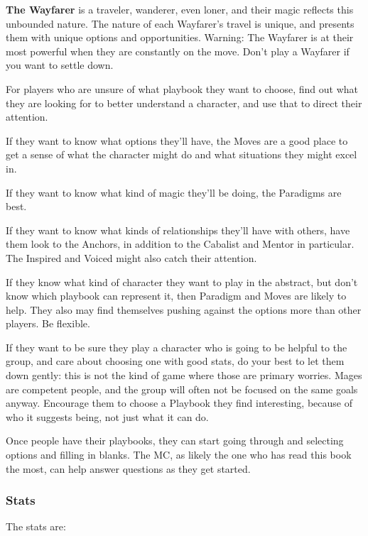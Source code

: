 \documentclass[
]{article}
\begin{document}
\textbf{The Wayfarer} is a traveler, wanderer, even loner, and their
magic reflects this unbounded nature. The nature of each Wayfarer's
travel is unique, and presents them with unique options and
opportunities. Warning: The Wayfarer is at their most powerful when they
are constantly on the move. Don't play a Wayfarer if you want to settle
down.

For players who are unsure of what playbook they want to choose, find
out what they are looking for to better understand a character, and use
that to direct their attention.

If they want to know what options they'll have, the Moves are a good
place to get a sense of what the character might do and what situations
they might excel in.

If they want to know what kind of magic they'll be doing, the Paradigms
are best.

If they want to know what kinds of relationships they'll have with
others, have them look to the Anchors, in addition to the Cabalist and
Mentor in particular. The Inspired and Voiced might also catch their
attention.

If they know what kind of character they want to play in the abstract,
but don't know which playbook can represent it, then Paradigm and Moves
are likely to help. They also may find themselves pushing against the
options more than other players. Be flexible.

If they want to be sure they play a character who is going to be helpful
to the group, and care about choosing one with good stats, do your best
to let them down gently: this is not the kind of game where those are
primary worries. Mages are competent people, and the group will often
not be focused on the same goals anyway. Encourage them to choose a
Playbook they find interesting, because of who it suggests being, not
just what it can do.

Once people have their playbooks, they can start going through and
selecting options and filling in blanks. The MC, as likely the one who
has read this book the most, can help answer questions as they get
started.

\hypertarget{stats-10}{%
\subsubsection{Stats}\label{stats-10}}

The stats are:
\end{document}
